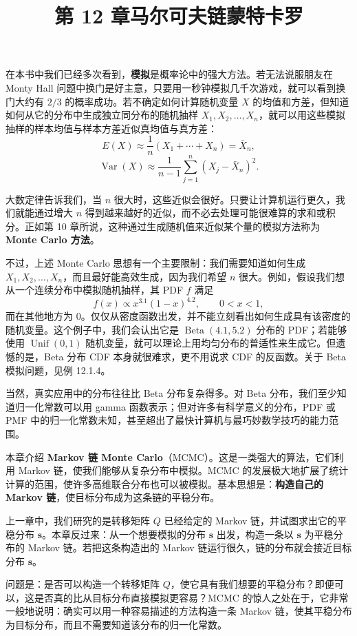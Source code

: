 \documentclass[UTF8, 12pt, fontset=fandol, oneside]{ctexart}
\title{第 12 章\quad 马尔可夫链蒙特卡罗}
\author{}
\date{}
\begin{document}
\maketitle

在本书中我们已经多次看到，\textbf{模拟}是概率论中的强大方法。若无法说服朋友在 Monty Hall 问题中换门是好主意，只要用一秒钟模拟几千次游戏，就可以看到换门大约有 $2/3$ 的概率成功。若不确定如何计算随机变量 $X$ 的均值和方差，但知道如何从它的分布中生成独立同分布的随机抽样 $X_1,X_2,\ldots,X_n$，就可以用这些模拟抽样的样本均值与样本方差近似真均值与真方差：
\[
  E(X)\approx \frac1n(X_1+\cdots+X_n)=\bar X_n,
\]
\[
  \operatorname{Var}(X)\approx
  \frac{1}{n-1}\sum_{j=1}^{n}(X_j-\bar X_n)^2.
\]

大数定律告诉我们，当 $n$ 很大时，这些近似会很好。只要让计算机运行更久，我们就能通过增大 $n$ 得到越来越好的近似，而不必去处理可能很难算的求和或积分。正如第 10 章所说，这种通过生成随机值来近似某个量的模拟方法称为 \textbf{Monte Carlo 方法}。

不过，上述 Monte Carlo 思想有一个主要限制：我们需要知道如何生成 $X_1,X_2,\ldots,X_n$，而且最好能高效生成，因为我们希望 $n$ 很大。例如，假设我们想从一个连续分布中模拟随机抽样，其 PDF $f$ 满足
\[
  f(x)\propto x^{3.1}(1-x)^{4.2},\qquad 0<x<1,
\]
而在其他地方为 $0$。仅仅从密度函数出发，并不能立刻看出如何生成具有该密度的随机变量。这个例子中，我们会认出它是 $\operatorname{Beta}(4.1,5.2)$ 分布的 PDF；若能够使用 $\operatorname{Unif}(0,1)$ 随机变量，就可以理论上用均匀分布的普适性来生成它。但遗憾的是，Beta 分布 CDF 本身就很难求，更不用说求 CDF 的反函数。关于 Beta 模拟问题，见例 12.1.4。

当然，真实应用中的分布往往比 Beta 分布复杂得多。对 Beta 分布，我们至少知道归一化常数可以用 gamma 函数表示；但对许多有科学意义的分布，PDF 或 PMF 中的归一化常数未知，甚至超出了最快计算机与最巧妙数学技巧的能力范围。

本章介绍 \textbf{Markov 链 Monte Carlo}（MCMC）。这是一类强大的算法，它们利用 Markov 链，使我们能够从复杂分布中模拟。MCMC 的发展极大地扩展了统计计算的范围，使许多高维联合分布也可以被模拟。基本思想是：\textbf{构造自己的 Markov 链}，使目标分布成为这条链的平稳分布。

上一章中，我们研究的是转移矩阵 $Q$ 已经给定的 Markov 链，并试图求出它的平稳分布 $\mathbf s$。本章反过来：从一个想要模拟的分布 $\mathbf s$ 出发，构造一条以 $\mathbf s$ 为平稳分布的 Markov 链。若把这条构造出的 Markov 链运行很久，链的分布就会接近目标分布 $\mathbf s$。

问题是：是否可以构造一个转移矩阵 $Q$，使它具有我们想要的平稳分布？即便可以，这是否真的比从目标分布直接模拟更容易？MCMC 的惊人之处在于，它非常一般地说明：确实可以用一种容易描述的方法构造一条 Markov 链，使其平稳分布为目标分布，而且不需要知道该分布的归一化常数。
\end{document}
